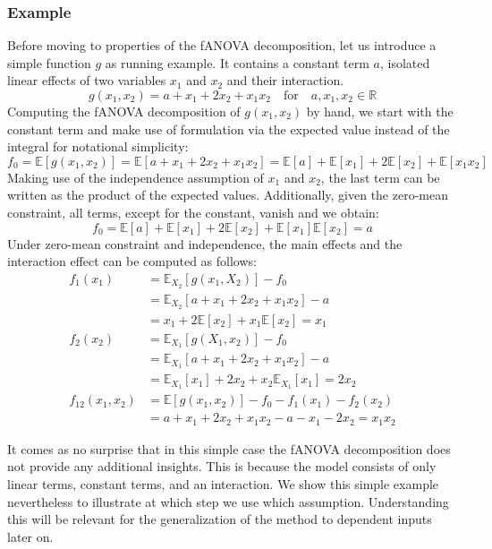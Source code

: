 \subsubsection*{Example}
Before moving to properties of the fANOVA decomposition, let us introduce a simple function $g$ as running example. It contains a constant term $a$, isolated linear effects of two variables $x_1$ and $x_2$ and their interaction.
\[
g(x_1, x_2) = a + x_1 + 2x_2 + x_1x_2 \quad \text{for} \quad a, x_1, x_2 \in \mathbb{R}
\]
Computing the fANOVA decomposition of $g(x_1, x_2)$ by hand, we start with the constant term and make use of formulation via the expected value instead of the integral for notational simplicity:
\[
f_0 = \mathbb{E}[g(x_1, x_2)] = \mathbb{E}[a + x_1 + 2x_2 + x_1x_2] = \mathbb{E}[a] + \mathbb{E}[x_1] + 2\mathbb{E}[x_2] + \mathbb{E}[x_1x_2]
\]
Making use of the independence assumption of $x_1$ and $x_2$, the last term can be written as the product of the expected values. Additionally, given the zero-mean constraint, all terms, except for the constant, vanish and we obtain:
\[
f_0 = \mathbb{E}[a] + \mathbb{E}[x_1] + 2\mathbb{E}[x_2] + \mathbb{E}[x_1]\mathbb{E}[x_2] = a
\]
Under zero-mean constraint and independence, the main effects and the interaction effect can be computed as follows:
\begin{align*}
f_1(x_1) &= \mathbb{E}_{X_2}[g(x_1, X_2)] - f_0 \\
&= \mathbb{E}_{X_2}[a + x_1 + 2x_2 + x_1x_2] - a \\
&= x_1 + 2\mathbb{E}[x_2] + x_1\mathbb{E}[x_2] = x_1\\
f_2(x_2) &= \mathbb{E}_{X_1}[g(X_1, x_2)] - f_0 \\
&= \mathbb{E}_{X_1}[a + x_1 + 2x_2 + x_1x_2] - a \\
&= \mathbb{E}_{X_1}[x_1] + 2x_2 + x_2\mathbb{E}_{X_1}[x_1] = 2x_2\\
f_{12}(x_1, x_2) &= \mathbb{E}[g(x_1, x_2)] - f_0 - f_1(x_1) - f_2(x_2) \\
&= a + x_1 + 2x_2 + x_1x_2 - a - x_1 - 2x_2 = x_1x_2
\end{align*}

It comes as no surprise that in this simple case the fANOVA decomposition does not provide any additional insights. This is because the model consists of only linear terms, constant terms, and an interaction. We show this simple example nevertheless to illustrate at which step we use which assumption. Understanding this will be relevant for the generalization of the method to dependent inputs later on.\par

